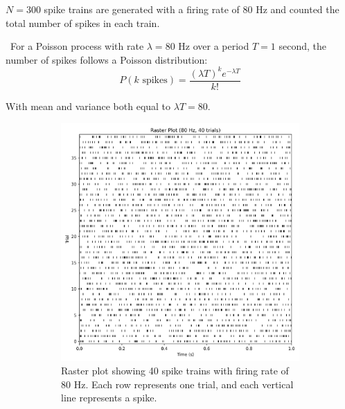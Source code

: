 \documentclass{article}
\begin{document}
$N = 300$ spike trains are generated with a firing rate of 80 Hz and counted the total number of spikes in each train.


\
For a Poisson process with rate $\lambda = 80$ Hz over a period $T = 1$ second, the number of spikes follows a Poisson distribution:
\begin{equation}
    P(k \text{ spikes}) = \frac{(\lambda T)^k e^{-\lambda T}}{k!}
\end{equation}

With mean and variance both equal to $\lambda T = 80$.

\begin{figure}[H]
\centering
\begin{subfigure}{0.48\textwidth}
    \includegraphics[width=\textwidth]{Fig2a.png}
    \caption{Raster plot showing 40 spike trains with firing rate of 80 Hz. Each row represents one trial, and each vertical line represents a spike.}
    \label{fig:raster_plot}
\end{subfigure}
\hfill
\begin{subfigure}{0.48\textwidth}

\end{subfigure}
\end{figure}
\end{document}
